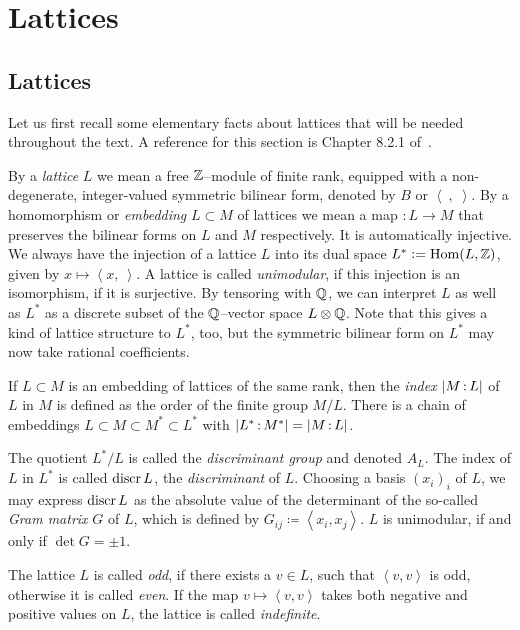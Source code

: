 \chapter{Lattices}
\section{Lattices}\label{latticeSubsection}
Let us first recall some elementary facts about lattices that will be needed throughout the text.
A reference for this section is Chapter 8.2.1 of~\cite{Dolgachev}. 
\begin{definition}
By a \emph{lattice} $L$ we mean a free $\mathbb{Z}$--module of finite rank, equipped with a non-degenerate, integer-valued symmetric bilinear form, denoted by $B$ or $\left<\ ,\;\right>$. 
By a homomorphism or \emph{embedding} $L\subset M$ of lattices we mean a map $:L\rightarrow M$ that preserves the bilinear forms on $L$ and $M$ respectively. It is automatically injective. We always have the injection of a lattice $L$ into its dual space $L^*\vcentcolon= \operatorname{Hom}(L,\mathbb{Z})$, given by $x \mapsto \left<x,\ \right>$. A lattice is called \emph{unimodular}, if this injection is an isomorphism, \ie if it is surjective. By tensoring with $\mathbb{Q}$, we can interpret $L$ as well as $L^*$ as a discrete subset of the $\mathbb{Q}$--vector space $L\otimes \mathbb{Q}$. Note that this gives a kind of lattice structure to $L^*$, too, but the symmetric bilinear form on $L^*$ may now take rational coefficients.


If $L\subset M$ is an embedding of lattices of the same rank, then the \emph{index} $|M\,{:}\, L|$ of $L$ in $M$ is defined as the order of the finite group $M/L$.
There is a chain of embeddings $L\subset M \subset M^* \subset L^*$ with $|L^*\,{:}\, M^*| =|M\,{:}\, L| $.

The quotient $L^*/L$ is called the \emph{discriminant group} and denoted $A_L$. The index of $L$ in $L^*$ is called $\operatorname{discr} L$, the \emph{discriminant} of $L$.
Choosing a basis $(x_i)_i$ of $L$, we may express $\operatorname{discr} L$ as the absolute value of the determinant of the so-called \emph{Gram matrix} $G$ of $L$, which is defined by $G_{ij}\coloneqq \left<x_i,x_j\right>$. $L$ is unimodular, if and only if $\det G =\pm 1$.

The lattice $L$ is called \emph{odd}, if there exists a $v\in L$, such that $\left<v,v\right>$ is odd, otherwise it is called \emph{even}. 
If the map $v \mapsto \left<v,v\right>$ takes both negative and positive values on $L$, the lattice is called \emph{indefinite}. 
\end{definition}
